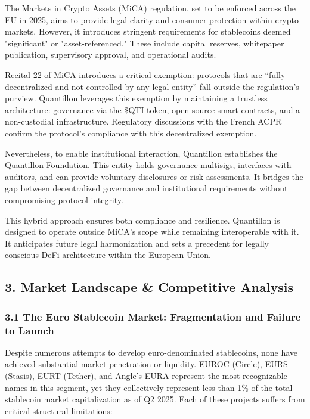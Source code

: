 The Markets in Crypto Assets (MiCA) regulation, set to be enforced
across the EU in 2025, aims to provide legal clarity and consumer
protection within crypto markets. However, it introduces stringent
requirements for stablecoins deemed "significant" or "asset-referenced."
These include capital reserves, whitepaper publication, supervisory
approval, and operational audits.

Recital 22 of MiCA introduces a critical exemption: protocols that are
``fully decentralized and not controlled by any legal entity'' fall
outside the regulation's purview. Quantillon leverages this exemption by
maintaining a trustless architecture: governance via the \$QTI token,
open-source smart contracts, and a non-custodial infrastructure.
Regulatory discussions with the French ACPR confirm the protocol's
compliance with this decentralized exemption.

Nevertheless, to enable institutional interaction, Quantillon
establishes the Quantillon Foundation. This entity holds governance
multisigs, interfaces with auditors, and can provide voluntary
disclosures or risk assessments. It bridges the gap between
decentralized governance and institutional requirements without
compromising protocol integrity.

This hybrid approach ensures both compliance and resilience. Quantillon
is designed to operate outside MiCA's scope while remaining
interoperable with it. It anticipates future legal harmonization and
sets a precedent for legally conscious DeFi architecture within the
European Union.

\hypertarget{market-landscape-competitive-analysis}{%
\subsection{3. Market Landscape \& Competitive
Analysis}\label{market-landscape-competitive-analysis}}

\hypertarget{the-euro-stablecoin-market-fragmentation-and-failure-to-launch}{%
\subsubsection{3.1 The Euro Stablecoin Market: Fragmentation and Failure
to
Launch}\label{the-euro-stablecoin-market-fragmentation-and-failure-to-launch}}

Despite numerous attempts to develop euro-denominated stablecoins, none
have achieved substantial market penetration or liquidity. EUROC
(Circle), EURS (Stasis), EURT (Tether), and Angle's EURA represent the
most recognizable names in this segment, yet they collectively represent
less than 1\% of the total stablecoin market capitalization as of Q2
2025. Each of these projects suffers from critical structural
limitations:

